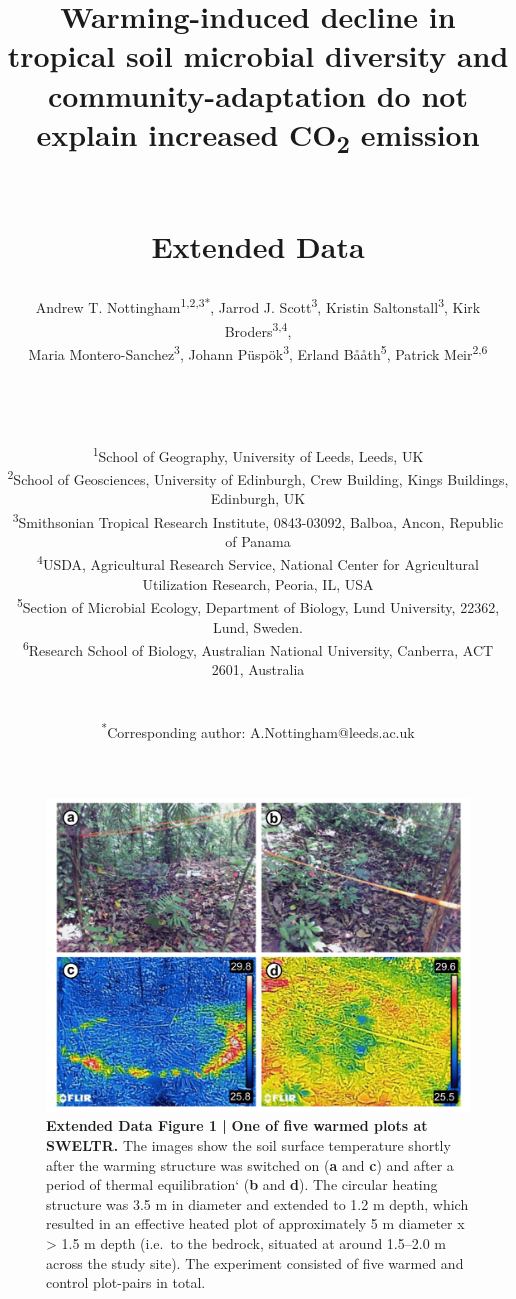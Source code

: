 \documentclass[
  letterpaper,
  DIV=11,
  numbers=noendperiod]{scrartcl}
\date{}
\title{\LARGE Warming-induced decline in tropical soil microbial
diversity and community-adaptation do not explain increased
CO\textsubscript{2} emission\\
\strut \\
Extended Data}
\author{Andrew T. Nottingham\textsuperscript{1,2,3*}, Jarrod J.
Scott\textsuperscript{3}, Kristin Saltonstall\textsuperscript{3}, Kirk
Broders\textsuperscript{3,4},\\
Maria Montero-Sanchez\textsuperscript{3}, Johann
Püspök\textsuperscript{3}, Erland Bååth\textsuperscript{5}, Patrick
Meir\textsuperscript{2,6}\\
\strut \\
\strut \\
\RaggedRight \small \textsuperscript{1}School of Geography, University
of Leeds, Leeds, UK\\
\small \textsuperscript{2}School of Geosciences, University of
Edinburgh, Crew Building, Kings Buildings, Edinburgh, UK\\
\small \textsuperscript{3}Smithsonian Tropical Research Institute,
0843-03092, Balboa, Ancon, Republic of Panama\\
\small \textsuperscript{4}USDA, Agricultural Research Service, National
Center for Agricultural Utilization Research, Peoria, IL, USA\\
\small \textsuperscript{5}Section of Microbial Ecology, Department of
Biology, Lund University, 22362, Lund, Sweden.\\
\small \textsuperscript{6}Research School of Biology, Australian
National University, Canberra, ACT 2601, Australia\\
\strut \\
\small \textsuperscript{*}Corresponding author:
A.Nottingham@leeds.ac.uk}
\date{}
\begin{document}
\maketitle
\ifdefined\Shaded\renewenvironment{Shaded}{\begin{tcolorbox}[breakable, boxrule=0pt, enhanced, interior hidden, borderline west={3pt}{0pt}{shadecolor}, sharp corners, frame hidden]}{\end{tcolorbox}}\fi

\begin{figure}

{\centering \includegraphics[width=1\textwidth,height=\textheight]{FIGURES/Extended_Data_Fig_1.png}

}

\caption{\textbf{Extended Data Figure 1 |}
\textbf{One of five warmed plots at SWELTR.} The images show the soil
surface temperature shortly after the warming structure was switched on
(\textbf{a} and \textbf{c}) and after a period of thermal equilibration`
(\textbf{b} and \textbf{d}). The circular heating structure was 3.5 m in
diameter and extended to 1.2 m depth, which resulted in an effective
heated plot of approximately 5 m diameter x \textgreater{} 1.5 m depth
(i.e.~to the bedrock, situated at around 1.5--2.0 m across the study
site). The experiment consisted of five warmed and control plot-pairs in
total.}

\end{figure}
\end{document}
